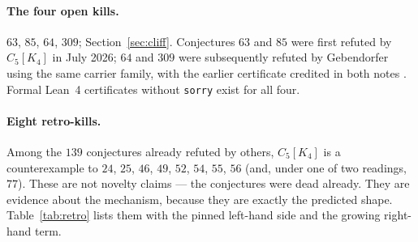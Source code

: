 \documentclass[10pt,a4paper]{article}
\theoremstyle{plain}
\theoremstyle{definition}
\newcommand{\blow}[2]{#1[K_{#2}]}
\begin{document}
\paragraph{The four open kills.} $63$, $85$, $64$, $309$; Section~\ref{sec:cliff}. Conjectures
$63$ and $85$ were first refuted by $\blow{C_5}{4}$ in July 2026; $64$ and $309$ were
subsequently refuted by Gebendorfer using the same carrier family, with the earlier certificate
credited in both notes \cite{geb64,geb309}. Formal Lean~4 certificates without \texttt{sorry}
exist for all four.

\paragraph{Eight retro-kills.} Among the $139$ conjectures already refuted by others,
$\blow{C_5}{4}$ is a counterexample to $24$, $25$, $46$, $49$, $52$, $54$, $55$, $56$ (and,
under one of two readings, $77$). These are not novelty claims --- the conjectures were dead
already. They are evidence about the mechanism, because they are exactly the predicted shape.
Table~\ref{tab:retro} lists them with the pinned left-hand side and the growing right-hand
term.
\end{document}
